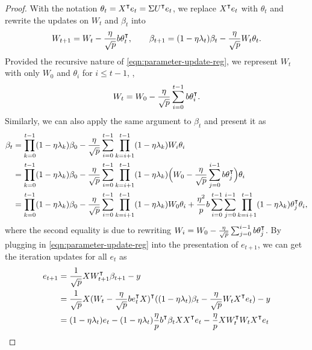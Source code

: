 \begin{proof}
    With the notation $\theta_t = X\transpose e_t = \Sigma U\transpose e_t$, we replace $X\transpose e_t$ with $\theta_t$ and rewrite the updates on $W_t$ and $\beta_t$ into 
    \begin{align}\label{eqn:parameter-update-reg}
        W_{t+1} = W_t - \frac{\eta}{\sqrt p}b \theta_t\transpose, \qquad \beta_{t+1} = (1-\eta\lambda_t)\beta_t - \frac{\eta}{\sqrt p} W_t\theta_t. 
    \end{align}
    Provided the recursive nature of \cref{eqn:parameter-update-reg}, we represent $W_t$ with only $W_0$ and $\theta_i$ for $i\leq t-1$, \ie,
    \begin{align}\label{eqn:Wt}
        W_t = W_0 - \frac{\eta}{\sqrt p} \sum_{i=0}^{t-1} b\theta_i\transpose.
    \end{align}
    Similarly, we can also apply the same argument to $\beta_t$ and present it as
    \begin{align}\label{eqn:betat}
        \beta_t &= \prod_{k=0}^{t-1}(1-\eta\lambda_k)\beta_0 - \frac{\eta}{\sqrt p}\sum_{i=0}^{t-1} \prod_{k=i+1}^{t-1}(1-\eta\lambda_k)W_i\theta_i \\
        & = \prod_{k=0}^{t-1}(1-\eta\lambda_k)\beta_0 - \frac{\eta}{\sqrt p}\sum_{i=0}^{t-1} \prod_{k=i+1}^{t-1}(1-\eta\lambda_k)\Big( W_0 - \frac{\eta}{\sqrt p} \sum_{j=0}^{i-1} b\theta_j\transpose\Big) \theta_i \\
        & = \prod_{k=0}^{t-1}(1-\eta\lambda_k)\beta_0 - \frac{\eta}{\sqrt p}\sum_{i=0}^{t-1} \prod_{k=i+1}^{t-1}(1-\eta\lambda_k)W_0\theta_i + \frac{\eta^2}{p}b\sum_{i=0}^{t-1}\sum_{j=0}^{i-1} \prod_{k=i+1}^{t-1}(1-\eta\lambda_k)\theta_j\transpose\theta_i,
    \end{align}
    where the second equality is due to rewriting $W_i = W_0 - \frac{\eta}{\sqrt p} \sum_{j=0}^{i-1} b\theta_j\transpose$. By plugging in \cref{eqn:parameter-update-reg} into the presentation of $e_{t+1}$, we can get the iteration updates for all $e_t$ as 
    \begin{align}\label{eqn:error-iterate}
        \begin{split}
            e_{t+1} 
            &=\frac{1}{\sqrt p}X W_{t+1}\transpose \beta_{t+1} - y \\
            &=\frac{1}{\sqrt p}X (W_t - \frac{\eta}{\sqrt p}b e_t\transpose X)\transpose((1-\eta\lambda_t)\beta_t-\frac{\eta}{\sqrt p} W_tX\transpose e_t) - y \\ 
            &=(1-\eta\lambda_t)e_t - (1-\eta\lambda_t) \frac{\eta}{p}b\transpose\beta_t XX\transpose e_t - \frac{\eta}{p}XW_t\transpose W_tX\transpose e_t \\

\end{split}
\end{align}
\end{proof}
